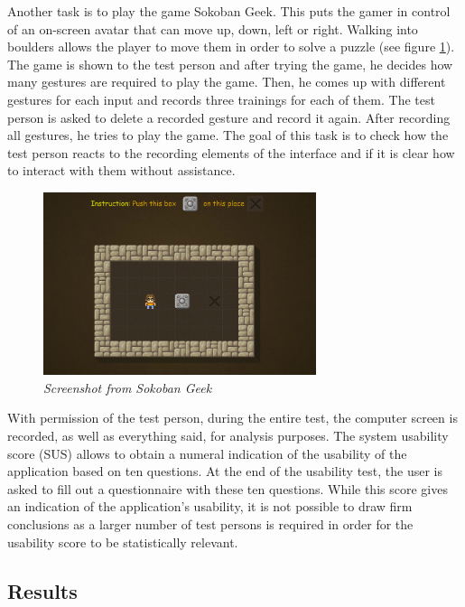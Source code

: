 Another task is to play the game Sokoban Geek. This puts the gamer in control of an on-screen avatar that can move up, down, left or right. Walking into boulders allows the player to move them in order to solve a puzzle (see figure \ref{fig: sokoban_geek}). The game is shown to the test person and after trying the game, he decides how many gestures are required to play the game. Then, he comes up with different gestures for each input and records three trainings for each of them. The test person is asked to delete a recorded gesture and record it again. After recording all gestures, he tries to play the game. The goal of this task is to check how the test person reacts to the recording elements of the interface and if it is clear how to interact with them without assistance.\\

\begin{figure}[H]
\begin{center}
\includegraphics[width=8cm]{SokobanGeek.png}
\caption{\emph{Screenshot from Sokoban Geek}}
\label{fig: sokoban_geek}
\end{center}
\end{figure}

\newpage

With permission of the test person, during the entire test, the computer screen is recorded, as well as everything said, for analysis purposes. The system usability score (SUS) allows to obtain a numeral indication of the usability of the application based on ten questions. At the end of the usability test, the user is asked to fill out a questionnaire with these ten questions. While this score gives an indication of the application's usability, it is not possible to draw firm conclusions as a larger number of test persons is required in order for the usability score to be statistically relevant.


\subsection{Results}

